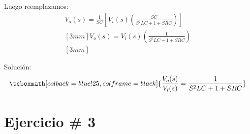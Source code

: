 \documentclass[12pt]{article}
\begin{document}
Luego reemplazamos:
\begin{eqnarray*}
  V_{o}(s) = \frac{1}{SC}\left[ V_{i}(s)\left( \frac{SC}{S^{2}LC+1+SRC} \right) \right] \\ [3mm]
  V_{o}(s) = V_{i}(s)\left( \frac{1}{S^{2}LC+1+SRC} \right) \\ [3mm]
\end{eqnarray*}

Solución:
\begin{eqnarray*}
\tcboxmath[colback=blue!25,colframe=black] {\frac{V_{o}(s)}{V_{i}(s)} = \frac{1}{S^{2}LC+1+SRC}}
\end{eqnarray*}

\newpage

\section{Ejercicio \# 3}
\end{document}
